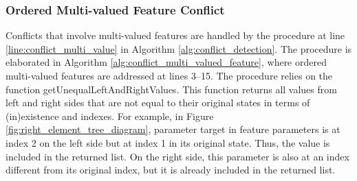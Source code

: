 \subsubsection{Ordered Multi-valued Feature Conflict} 
\label{sec:ordered_conflict}
Conflicts that involve multi-valued features are handled by the procedure at line \ref{line:conflict_multi_value} in Algorithm \ref{alg:conflict_detection}. The procedure is elaborated in Algorithm \ref{alg:conflict_multi_valued_feature}, where ordered multi-valued features are addressed at lines 3–15. The procedure relies on the function \textsf{getUnequalLeftAndRightValues}. This function returns all values from left and right sides that are not equal to their original states in terms of (in)existence and indexes. For example, in Figure \ref{fig:right_element_tree_diagram}, parameter \textsf{target} in feature \textsf{parameters} is at index 2 on the left side but at index 1 in its original state. Thus, the value is included in the returned list. On the right side, this parameter is also at an index different from its original index, but it is already included in the returned list.

